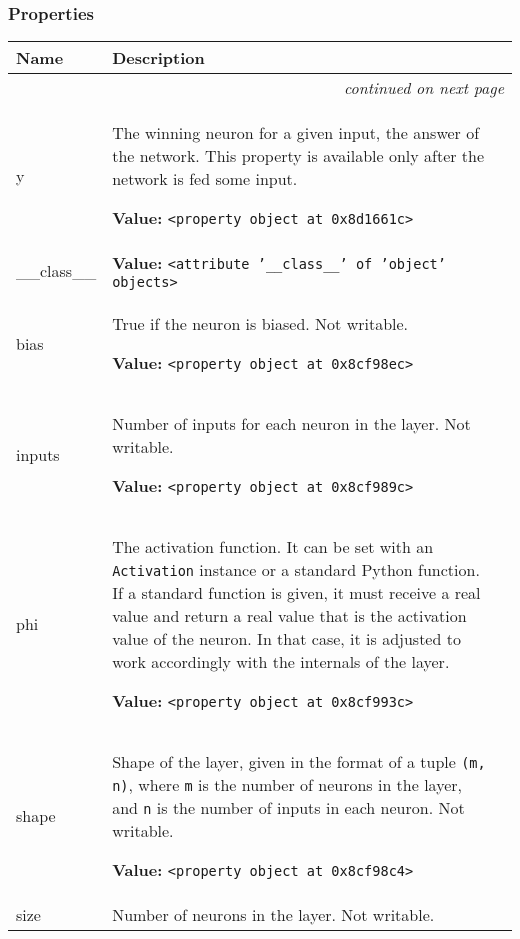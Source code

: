   \subsubsection{Properties}

\begin{longtable}{|p{}|p{}|l}
\cline{1-2}
\cline{1-2} \centering \textbf{Name} & \centering \textbf{Description}& \\
\cline{1-2}
\endhead\cline{1-2}\multicolumn{3}{r}{\small\textit{continued on next page}}\\\endfoot\cline{1-2}
\endlastfoot\raggedright y\- & \raggedright The winning neuron for a given input, the answer of the network. This
property is available only after the network is fed some input.

\textbf{Value:} 
{\tt {\textless}property object at 0x8d1661c{\textgreater}}&\\
\cline{1-2}
\raggedright \_\-\_\-c\-l\-a\-s\-s\-\_\-\_\- & \raggedright \textbf{Value:} 
{\tt {\textless}attribute '\_\_class\_\_' of 'object' objects{\textgreater}}&\\
\cline{1-2}
\raggedright b\-i\-a\-s\- & \raggedright True if the neuron is biased. Not writable.

\textbf{Value:} 
{\tt {\textless}property object at 0x8cf98ec{\textgreater}}&\\
\cline{1-2}
\raggedright i\-n\-p\-u\-t\-s\- & \raggedright Number of inputs for each neuron in the layer. Not writable.

\textbf{Value:} 
{\tt {\textless}property object at 0x8cf989c{\textgreater}}&\\
\cline{1-2}
\raggedright p\-h\-i\- & \raggedright The activation function. It can be set with an \texttt{Activation} instance or
a standard Python function. If a standard function is given, it must receive
a real value and return a real value that is the activation value of the
neuron. In that case, it is adjusted to work accordingly with the internals
of the layer.

\textbf{Value:} 
{\tt {\textless}property object at 0x8cf993c{\textgreater}}&\\
\cline{1-2}
\raggedright s\-h\-a\-p\-e\- & \raggedright Shape of the layer, given in the format of a tuple \texttt{(m, n)}, where
\texttt{m} is the number of neurons in the layer, and \texttt{n} is the number of
inputs in each neuron. Not writable.

\textbf{Value:} 
{\tt {\textless}property object at 0x8cf98c4{\textgreater}}&\\
\cline{1-2}
\raggedright s\-i\-z\-e\- & \raggedright Number of neurons in the layer. Not writable.


\end{longtable}
